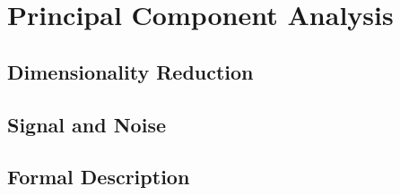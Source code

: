 \section{Principal Component Analysis}

\subsection{Dimensionality Reduction}

\subsection{Signal and Noise}

\subsection{Formal Description}